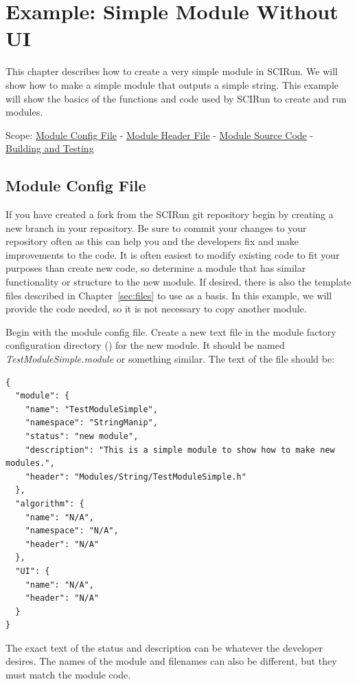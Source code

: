 \documentclass[fleqn,11pt,openany]{book}
\begin{document}

\chapter{Example: Simple Module Without UI}
\label{sec:ex_simple}

\begin{introduction}
This chapter describes how to create a very simple module in SCIRun.  
We will show how to make a simple module that outputs a simple string.  
This example will show the basics of the functions and code used by SCIRun to create and run modules.

Scope: \hyperref[sec:examp_config]{Module Config File} - \hyperref[sec:examp_header]{Module Header File} - \hyperref[sec:examp_source]{Module Source Code} - \hyperref[sec:testing]{Building and Testing}
\end{introduction}

\section{Module Config File}
\label{sec:examp_config}

If you have created a fork from the SCIRun git repository begin by creating a new branch in your repository.  
Be sure to commit your changes to your repository often as this can help you and the developers fix and make improvements to the code.
It is often easiest to modify existing code to fit your purposes than create new code, so determine a module that has similar functionality or structure to the new module.  
If desired, there is also the template files described in Chapter~\ref{sec:files} to use as a basis.  
In this example, we will provide the code needed, so it is not necessary to copy another module.  

Begin with the module config file.  
Create a new text file in the module factory configuration directory (\emph{}) for the new module.  
It should be named \emph{TestModuleSimple.module} or something similar.  
The text of the file should be:
\begin{verbatim}
{
  "module": {
    "name": "TestModuleSimple",
    "namespace": "StringManip",
    "status": "new module",
    "description": "This is a simple module to show how to make new modules.",
    "header": "Modules/String/TestModuleSimple.h"
  },
  "algorithm": {
    "name": "N/A",
    "namespace": "N/A",
    "header": "N/A"
  },
  "UI": {
    "name": "N/A",
    "header": "N/A"
  }
}
\end{verbatim}
The exact text of the status and description can be whatever the developer desires. 
The names of the module and filenames can also be different, but they must match the module code.  
\end{document}
